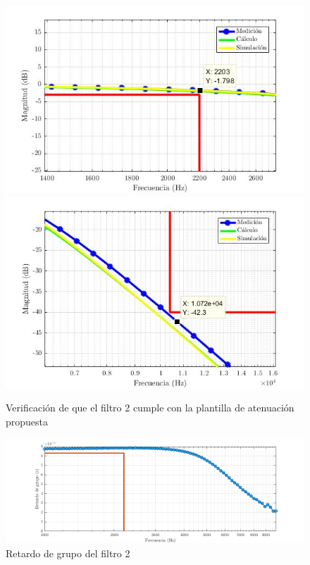 \documentclass[../../tc_tp5_main.tex]{subfiles}
\begin{document}
\begin{figure}[H]
	\centering
	\includegraphics[scale=0.42]{imagenes/bes_bandapasante.jpg}
	\includegraphics[scale=0.4]{imagenes/bes_bandaatenuada.jpg}
	\caption{Verificaci\'on de que el filtro 2 cumple con la plantilla de atenuaci\'on propuesta}
\end{figure}



\begin{figure}[H]
	\centering
	\includegraphics[scale=0.7]{imagenes/tc_tp5_ej1_gd.png}
	\caption{Retardo de grupo del filtro 2}
\end{figure}
\end{document}

